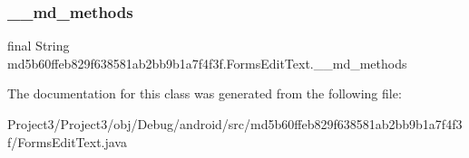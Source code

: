 \subsubsection{\texorpdfstring{\+\_\+\+\_\+md\+\_\+methods}{\_\_md\_methods}}
{\footnotesize\ttfamily final String md5b60ffeb829f638581ab2bb9b1a7f4f3f.\+Forms\+Edit\+Text.\+\_\+\+\_\+md\+\_\+methods\hspace{0.3cm}{\ttfamily [static]}}



The documentation for this class was generated from the following file\+:\begin{DoxyCompactItemize}
\item 
Project3/\+Project3/obj/\+Debug/android/src/md5b60ffeb829f638581ab2bb9b1a7f4f3f/Forms\+Edit\+Text.\+java\end{DoxyCompactItemize}

